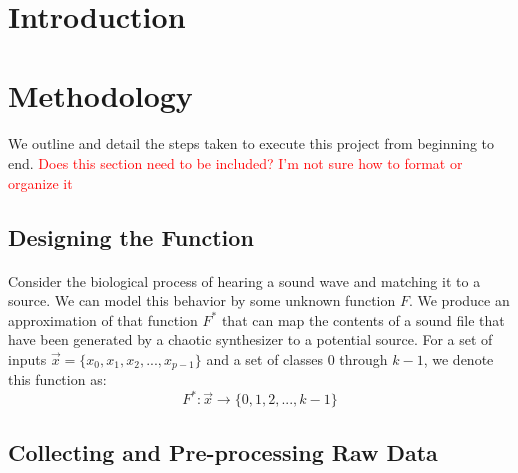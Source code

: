 \documentclass[12pt,letterpaper]{article}
\begin{document}
\section{Introduction}
\label{sec-Introduction}


\newpage
\section{Methodology}
\label{sec-Methodology}

\paragraph*{}We outline and detail the steps taken to execute this project from beginning to end.
\textcolor{red}{Does this section need to be included? I'm not sure how to format or organize it}


\subsection{Designing the Function}

\paragraph*{}Consider the biological process of hearing a sound wave and matching it to a source. We can model this behavior by some unknown function $F$. We produce an approximation of that function $F^*$ that can map the contents of a sound file that have been generated by a chaotic synthesizer to a potential source. For a set of inputs $\vec{x} = \big\{ x_0 , x_1 , x_2 , ... , x_{p-1} \big\}$ and a set of classes $0$ through $k-1$, we denote this function as:
\begin{equation}
\label{eqn-MappingFunction}
F^*: \vec{x} \rightarrow \big\{ 0 , 1 , 2 , ... , k-1 \big\}
\end{equation}


\subsection{Collecting and Pre-processing Raw Data}
\end{document}
